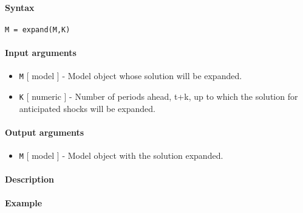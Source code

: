 


	\paragraph{Syntax}

\begin{verbatim}
M = expand(M,K)
\end{verbatim}

\paragraph{Input arguments}

\begin{itemize}
\item
  \texttt{M} {[} model {]} - Model object whose solution will be
  expanded.
\item
  \texttt{K} {[} numeric {]} - Number of periods ahead, t+k, up to which
  the solution for anticipated shocks will be expanded.
\end{itemize}

\paragraph{Output arguments}

\begin{itemize}
\itemsep1pt\parskip0pt
\item
  \texttt{M} {[} model {]} - Model object with the solution expanded.
\end{itemize}

\paragraph{Description}

\paragraph{Example}



